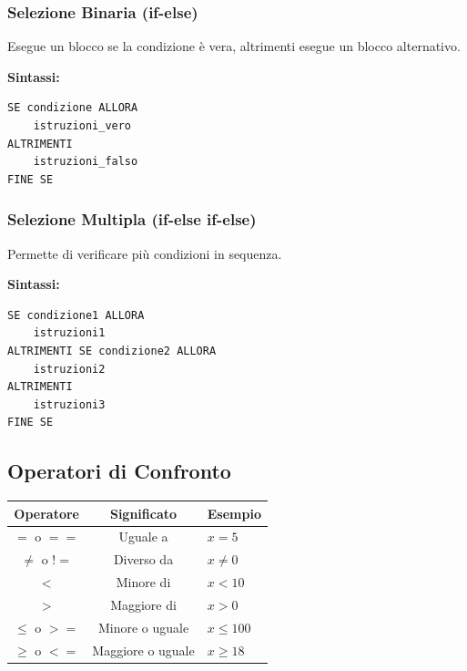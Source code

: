 \documentclass[a4paper,16pt]{article}
\begin{document}
\newpage
\subsubsection{Selezione Binaria (if-else)}

Esegue un blocco se la condizione è vera, altrimenti esegue un blocco alternativo.

\textbf{Sintassi:}
\begin{lstlisting}
SE condizione ALLORA
    istruzioni_vero
ALTRIMENTI
    istruzioni_falso
FINE SE
\end{lstlisting}

\begin{center}
\end{center}

\subsubsection{Selezione Multipla (if-else if-else)}

Permette di verificare più condizioni in sequenza.

\textbf{Sintassi:}
\begin{lstlisting}
SE condizione1 ALLORA
    istruzioni1
ALTRIMENTI SE condizione2 ALLORA
    istruzioni2
ALTRIMENTI
    istruzioni3
FINE SE
\end{lstlisting}

\subsection{Operatori di Confronto}

\begin{center}
\begin{tabular}{|c|c|l|}
\hline
\textbf{Operatore} & \textbf{Significato} & \textbf{Esempio} \\
\hline
$=$ o $==$ & Uguale a & $x = 5$ \\
$\neq$ o $!=$ & Diverso da & $x \neq 0$ \\
$<$ & Minore di & $x < 10$ \\
$>$ & Maggiore di & $x > 0$ \\
$\leq$ o $>=$ & Minore o uguale & $x \leq 100$ \\
$\geq$ o $<=$ & Maggiore o uguale & $x \geq 18$ \\
\hline
\end{tabular}
\end{center}
\end{document}
